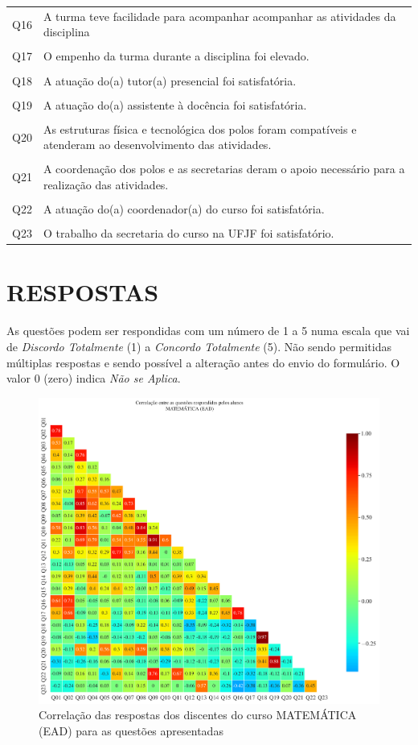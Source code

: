\documentclass[a4paper,10pt]{article}
\begin{document}
{\begin{center}
\begin{tabularx}{\linewidth}{c|X}
Q16&A turma teve facilidade para acompanhar acompanhar as atividades da disciplina\\\\
Q17&O empenho da turma durante a disciplina foi elevado.\\\\
Q18&A atuação do(a) tutor(a) presencial foi satisfatória.\\\\
Q19&A atuação do(a) assistente à docência foi satisfatória.\\\\
Q20&As estruturas física e tecnológica dos polos foram compatíveis e atenderam ao desenvolvimento das atividades.\\\\
Q21&A coordenação dos polos e as secretarias deram o apoio necessário para a realização das atividades.\\\\
Q22&A atuação do(a) coordenador(a) do curso foi satisfatória.\\\\
Q23&O trabalho da secretaria do curso na UFJF foi satisfatório.
\end{tabularx}
\end{center}
}
\section{RESPOSTAS}
As questões podem ser respondidas com um número de 1 a 5 numa escala que vai de {\it Discordo Totalmente} (1) a {\it Concordo Totalmente} (5). Não sendo permitidas múltiplas respostas e sendo possível a alteração antes do envio do formulário. O valor 0 (zero) indica {\it Não se Aplica}.


\begin{figure}[h]
\centering
\includegraphics[width=0.999\linewidth]{matriz_corr__113525.png}
\caption{\label{fig:corr_alunos}Correlação das respostas dos discentes do curso MATEMÁTICA (EAD) para as questões apresentadas}
\end{figure}
\end{document}
